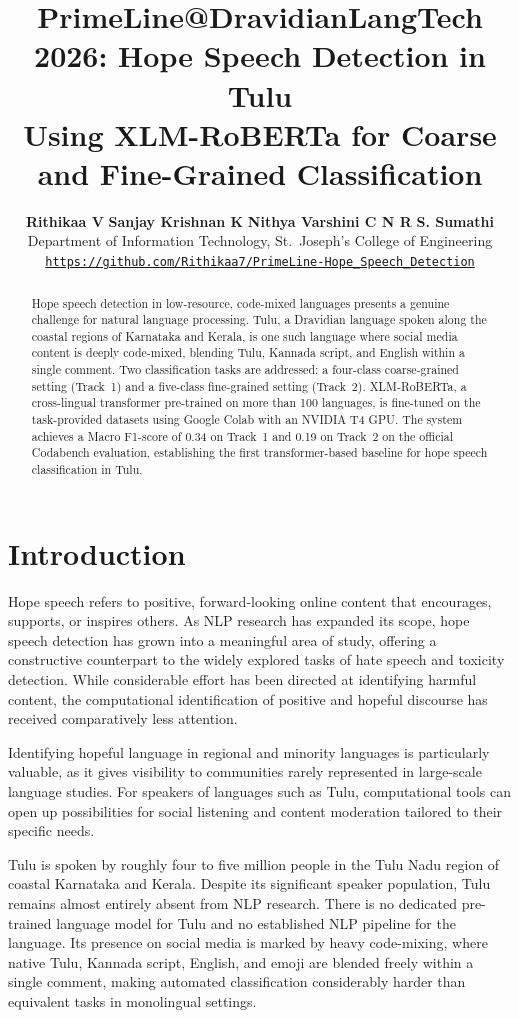 \documentclass[11pt]{article}
\title{PrimeLine@DravidianLangTech 2026: Hope Speech Detection in Tulu\\
Using XLM-RoBERTa for Coarse and Fine-Grained Classification}
\author{
  \textbf{Rithikaa V} \quad \textbf{Sanjay Krishnan K} \quad \textbf{Nithya Varshini C N R} \quad \textbf{S. Sumathi}\\
  Department of Information Technology, St.\ Joseph's College of Engineering\\
  \href{https://github.com/Rithikaa7/PrimeLine-Hope_Speech_Detection}{\texttt{https://github.com/Rithikaa7/PrimeLine-Hope\_Speech\_Detection}}
}
\begin{document}
\maketitle

\begin{abstract}
Hope speech detection in low-resource, code-mixed languages presents a genuine challenge
for natural language processing. Tulu, a Dravidian language spoken along the coastal regions of Karnataka and Kerala, is one such
language where social media content is deeply
code-mixed, blending Tulu, Kannada script,
and English within a single comment. Two
classification tasks are addressed: a four-class
coarse-grained setting (Track~1) and a five-class
fine-grained setting (Track~2). XLM-RoBERTa,
a cross-lingual transformer pre-trained on more
than 100 languages, is fine-tuned on the task-provided datasets using Google Colab with
an NVIDIA T4 GPU. The system achieves a
Macro F1-score of 0.34 on Track~1 and 0.19
on Track~2 on the official Codabench evaluation, establishing the first transformer-based
baseline for hope speech classification in Tulu.
\end{abstract}

\section{Introduction}

Hope speech refers to positive, forward-looking online content that encourages, supports, or inspires
others. As NLP research has expanded its scope,
hope speech detection has grown into a meaningful
area of study, offering a constructive counterpart
to the widely explored tasks of hate speech and
toxicity detection. While considerable effort has
been directed at identifying harmful content, the
computational identification of positive and hopeful discourse has received comparatively less attention.

Identifying hopeful language in regional and
minority languages is particularly valuable, as it
gives visibility to communities rarely represented
in large-scale language studies. For speakers of
languages such as Tulu, computational tools can
open up possibilities for social listening and content moderation tailored to their specific needs.

Tulu is spoken by roughly four to five million
people in the Tulu Nadu region of coastal Karnataka and Kerala. Despite its significant speaker
population, Tulu remains almost entirely absent
from NLP research. There is no dedicated pre-trained language model for Tulu and no established
NLP pipeline for the language. Its presence on social media is marked by heavy code-mixing, where
native Tulu, Kannada script, English, and emoji are
blended freely within a single comment, making
automated classification considerably harder than
equivalent tasks in monolingual settings.
\end{document}
